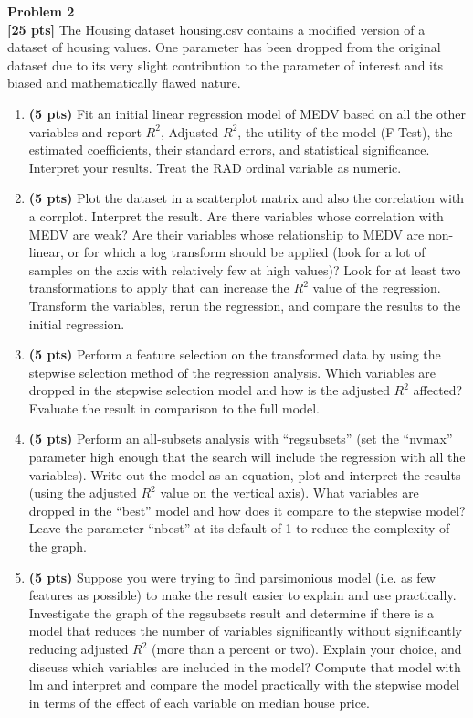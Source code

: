 \documentclass{article}
\newenvironment{problem}[2][Problem]
    { \begin{mdframed}[backgroundcolor=gray!20] \textbf{#1 #2} \\}
    {  \end{mdframed}}
\begin{document}
\newpage
\begin{problem}{2}
\textbf{[25 pts]}
The Housing dataset housing.csv contains a modified version of a dataset of housing values. One parameter has been dropped from the original dataset due to its very slight contribution to the parameter of interest and its biased and mathematically flawed nature.
\begin{enumerate}
	\item\textbf{(5 pts)} Fit an initial linear regression model of MEDV based on all the other variables and report $R^2$, Adjusted $R^2$, the utility of the model (F-Test), the estimated coefficients, their standard errors, and statistical significance. Interpret your results. Treat the RAD ordinal variable as numeric.
	\item\textbf{(5 pts)} Plot the dataset in a scatterplot matrix and also the correlation with a corrplot. Interpret the result. Are there variables whose correlation with MEDV are weak? Are their variables whose relationship to MEDV are non-linear, or for which a log transform should be applied (look for a lot of samples on the axis with relatively few at high values)? Look for at least two transformations to apply that can increase the $R^2$ value of the regression. Transform the variables, rerun the regression, and compare the results to the initial regression.
	\item\textbf{(5 pts)} Perform a feature selection on the transformed data by using the stepwise selection method of the regression analysis. Which variables are dropped in the stepwise selection model and how is the adjusted $R^2$ affected? Evaluate the result in comparison to the full model.
	\item\textbf{(5 pts)} Perform an all-subsets analysis with “regsubsets” (set the “nvmax” parameter high enough that the search will include the regression with all the variables). Write out the model as an equation, plot and interpret the results (using the adjusted $R^2$ value on the vertical axis). What variables are dropped in the “best” model and how does it compare to the stepwise model? Leave the parameter “nbest” at its default of 1 to reduce the complexity of the graph.
	\item\textbf{(5 pts)} Suppose you were trying to find parsimonious model (i.e. as few features as possible) to make the result easier to explain and use practically. Investigate the graph of the regsubsets result and determine if there is a model that reduces the number of variables significantly without significantly reducing adjusted $R^2$ (more than a percent or two). Explain your choice, and discuss which variables are included in the model? Compute that model with lm and interpret and compare the model practically with the stepwise model in terms of the effect of each variable on median house price.
\end{enumerate}
\end{problem}
\end{document}
